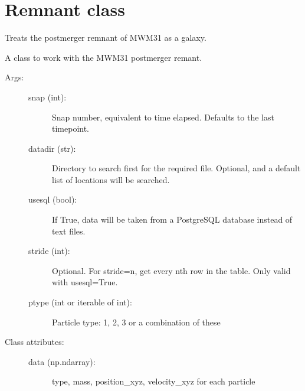 \documentclass[letterpaper,10pt,english]{sphinxmanual}
\begin{document}
\label{\detokenize{remnant:module-galaxy.remnant}}

\chapter{Remnant class}
\label{\detokenize{remnant:remnant-class}}\label{\detokenize{remnant::doc}}
Treats the post\sphinxhyphen{}merger remnant of MW\sphinxhyphen{}M31 as a galaxy.

\begin{fulllineitems}
\label{\detokenize{remnant:galaxy.remnant.Remnant}}
A class to work with the MW\sphinxhyphen{}M31 post\sphinxhyphen{}merger remant.
\begin{description}
\item[{Args:}] \leavevmode\begin{description}
\item[{snap (int):}] \leavevmode
Snap number, equivalent to time elapsed. 
Defaults to the last timepoint.

\item[{datadir (str):}] \leavevmode
Directory to search first for the required file. Optional, and a
default list of locations will be searched.

\item[{usesql (bool):}] \leavevmode
If True, data will be taken from a PostgreSQL database instead of
text files.

\item[{stride (int):}] \leavevmode
Optional. For stride=n, get every nth row in the table.
Only valid with usesql=True.

\item[{ptype (int or iterable of int):}] \leavevmode
Particle type: 1, 2, 3 or a combination of these

\end{description}

\item[{Class attributes:}] \leavevmode\begin{description}
\item[{data (np.ndarray):}] \leavevmode
type, mass, position\_xyz, velocity\_xyz for each particle


\end{description}
\end{description}
\end{fulllineitems}
\end{document}
